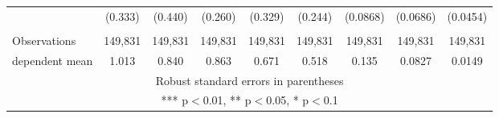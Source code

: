 \begin{tabular}{lcccccccc}
 & (0.333) & (0.440) & (0.260) & (0.329) & (0.244) & (0.0868) & (0.0686) & (0.0454) \\
 &  &  &  &  &  &  &  &  \\
Observations & 149,831 & 149,831 & 149,831 & 149,831 & 149,831 & 149,831 & 149,831 & 149,831 \\
 dependent mean & 1.013 & 0.840 & 0.863 & 0.671 & 0.518 & 0.135 & 0.0827 & 0.0149 \\ \hline
\multicolumn{9}{c}{ Robust standard errors in parentheses} \\
\multicolumn{9}{c}{ *** p$<$0.01, ** p$<$0.05, * p$<$0.1} \\
\end{tabular}
